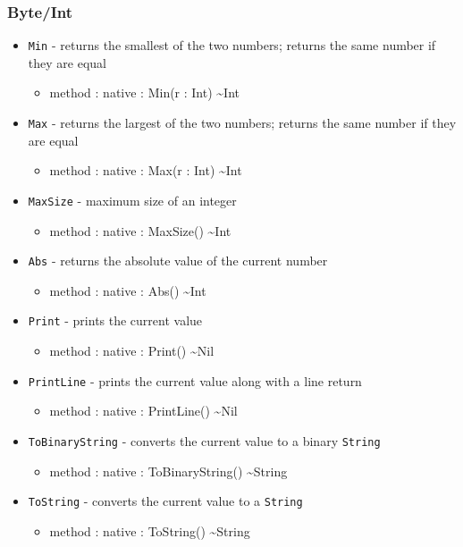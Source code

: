 \documentclass[11pt]{article}
\begin{document}
\subsubsection{Byte/Int}
\begin{itemize}
\item \texttt{Min} - returns the smallest of the two numbers; returns
  the same number if they are equal
  \begin{itemize}
  \item method : native : Min(r : Int) \textasciitilde Int
  \end{itemize}
\item \texttt{Max} - returns the largest of the two numbers; returns
  the same number if they are equal
  \begin{itemize}
  \item method : native : Max(r : Int) \textasciitilde Int
  \end{itemize}

\item \texttt{MaxSize} - maximum size of an integer
  \begin{itemize}
  \item method : native : MaxSize() \textasciitilde Int
  \end{itemize}

\item \texttt{Abs} - returns the absolute value of the current number
  \begin{itemize}
  \item method : native : Abs() \textasciitilde Int
  \end{itemize}
\item \texttt{Print} - prints the current value
  \begin{itemize}
  \item method : native : Print() \textasciitilde Nil
  \end{itemize}
\item \texttt{PrintLine} - prints the current value along with a line
  return
  \begin{itemize}
  \item method : native : PrintLine() \textasciitilde Nil
  \end{itemize}
\item \texttt{ToBinaryString} - converts the current value to a binary
  \texttt{String}
  \begin{itemize}
  \item method : native : ToBinaryString() \textasciitilde String
  \end{itemize}
\item \texttt{ToString} - converts the current value to a
  \texttt{String}
  \begin{itemize}
  \item method : native : ToString() \textasciitilde String
  \end{itemize}
\end{itemize}
\end{document}
